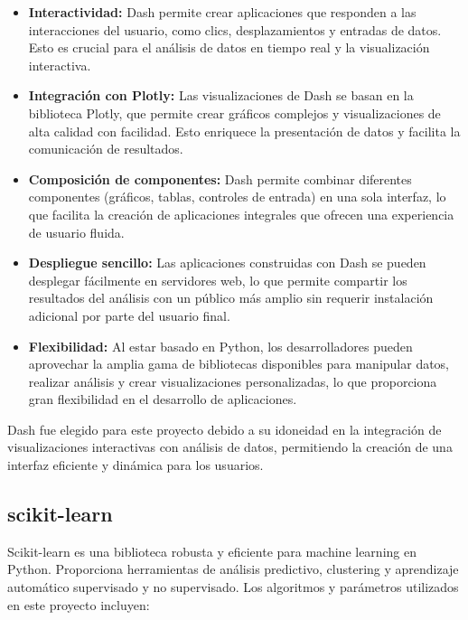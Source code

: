\begin{itemize}
	\item \textbf{Interactividad:} Dash permite crear aplicaciones que responden a las interacciones del usuario, como clics, desplazamientos y entradas de datos. Esto es crucial para el análisis de datos en tiempo real y la visualización interactiva.
	\item \textbf{Integración con Plotly:} Las visualizaciones de Dash se basan en la biblioteca Plotly, que permite crear gráficos complejos y visualizaciones de alta calidad con facilidad. Esto enriquece la presentación de datos y facilita la comunicación de resultados.
	\item \textbf{Composición de componentes:} Dash permite combinar diferentes componentes (gráficos, tablas, controles de entrada) en una sola interfaz, lo que facilita la creación de aplicaciones integrales que ofrecen una experiencia de usuario fluida.
	\item \textbf{Despliegue sencillo:} Las aplicaciones construidas con Dash se pueden desplegar fácilmente en servidores web, lo que permite compartir los resultados del análisis con un público más amplio sin requerir instalación adicional por parte del usuario final.
	\item \textbf{Flexibilidad:} Al estar basado en Python, los desarrolladores pueden aprovechar la amplia gama de bibliotecas disponibles para manipular datos, realizar análisis y crear visualizaciones personalizadas, lo que proporciona gran flexibilidad en el desarrollo de aplicaciones.
\end{itemize}

Dash fue elegido para este proyecto debido a su idoneidad en la integración de visualizaciones interactivas con análisis de datos, permitiendo la creación de una interfaz eficiente y dinámica para los usuarios.

\subsection{scikit-learn}

Scikit-learn \cite{sklearn_cluster} es una biblioteca robusta y eficiente para machine learning en Python. Proporciona herramientas de análisis predictivo, clustering y aprendizaje automático supervisado y no supervisado. Los algoritmos y parámetros utilizados en este proyecto incluyen:

